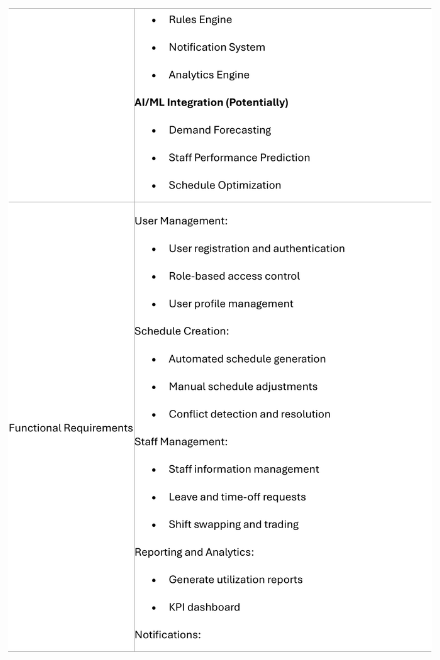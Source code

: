 \documentclass[a4paper,12pt, oneside]{report}
\begin{document}
\begin{appendices}
\begin{figure}[H]
    \includegraphics[width=\textwidth]{Minutes/Minutes_3-cropped-2.png}
\end{figure}
\newpage
\begin{figure}[H]
    \centering

\end{figure}
\end{appendices}
\end{document}
